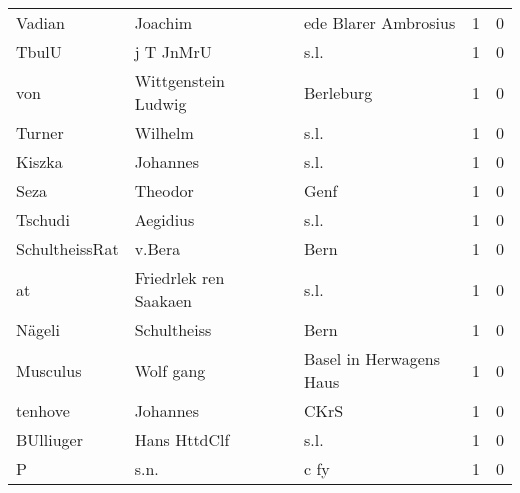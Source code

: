 \begin{tabular}{llllrr}
                   Vadian &                            Joachim &             &                        ede Blarer Ambrosius &          1 &         0 \\
                    TbulU &                          j T JnMrU &             &                                        s.l. &          1 &         0 \\
                      von &                Wittgenstein Ludwig &             &                                   Berleburg &          1 &         0 \\
                   Turner &                            Wilhelm &             &                                        s.l. &          1 &         0 \\
                   Kiszka &                           Johannes &             &                                        s.l. &          1 &         0 \\
                     Seza &                            Theodor &             &                                        Genf &          1 &         0 \\
                  Tschudi &                           Aegidius &             &                                        s.l. &          1 &         0 \\
           SchultheissRat &                             v.Bera &             &                                        Bern &          1 &         0 \\
                       at &              Friedrlek ren Saakaen &             &                                        s.l. &          1 &         0 \\
                   Nägeli &                        Schultheiss &             &                                        Bern &          1 &         0 \\
                 Musculus &                          Wolf gang &             &                     Basel in Herwagens Haus &          1 &         0 \\
                  tenhove &                           Johannes &             &                                        CKrS &          1 &         0 \\
                BUlliuger &                       Hans HttdClf &             &                                        s.l. &          1 &         0 \\
                        P &                               s.n. &             &                                        c fy &          1 &         0 \\

\end{tabular}
